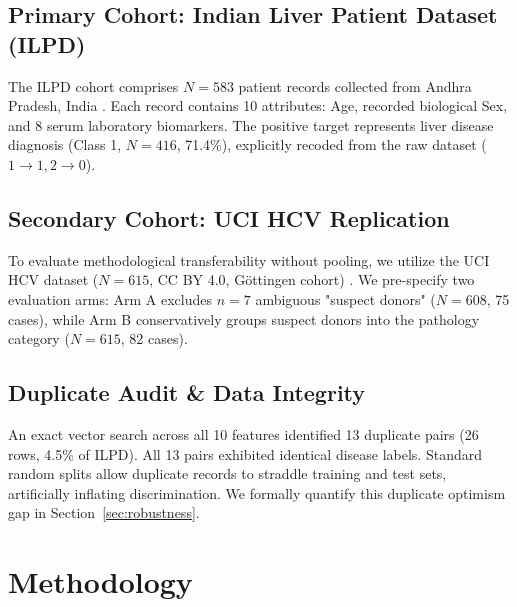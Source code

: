 \documentclass[11pt,a4paper]{article}
\begin{document}
\subsection{Primary Cohort: Indian Liver Patient Dataset (ILPD)}
The ILPD cohort comprises $N=583$ patient records collected from Andhra Pradesh, India \cite{ramana2012critical}. Each record contains 10 attributes: Age, recorded biological Sex, and 8 serum laboratory biomarkers. The positive target represents liver disease diagnosis (Class 1, $N=416$, 71.4\%), explicitly recoded from the raw dataset ($1 \to 1, 2 \to 0$).

\subsection{Secondary Cohort: UCI HCV Replication}
To evaluate methodological transferability without pooling, we utilize the UCI HCV dataset ($N=615$, CC BY 4.0, Göttingen cohort) \cite{lichtinghagen2013ggt}. We pre-specify two evaluation arms: Arm A excludes $n=7$ ambiguous "suspect donors" ($N=608$, 75 cases), while Arm B conservatively groups suspect donors into the pathology category ($N=615$, 82 cases).



\subsection{Duplicate Audit \& Data Integrity}
An exact vector search across all 10 features identified 13 duplicate pairs (26 rows, 4.5\% of ILPD). All 13 pairs exhibited identical disease labels. Standard random splits allow duplicate records to straddle training and test sets, artificially inflating discrimination. We formally quantify this duplicate optimism gap in Section~\ref{sec:robustness}.

\section{Methodology}
\end{document}
